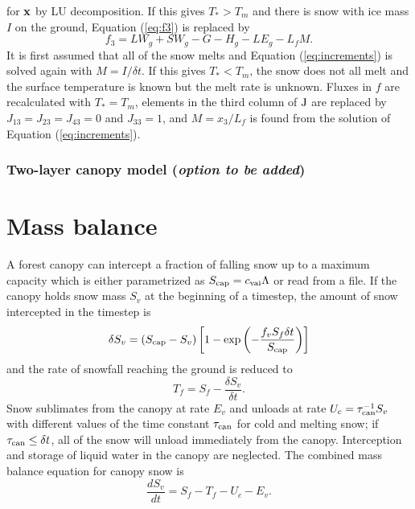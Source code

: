 \documentclass{article}
\begin{document}
for ${\bf x}$ by LU decomposition. If this gives $T_* > T_m$ and there is snow with ice mass $I$ on the ground, Equation (\ref{eq:f3}) is replaced by
\begin{equation}
f_3 = LW_g + SW_g - G - H_g - LE_g - L_fM.
\end{equation}
It is first assumed that all of the snow melts and Equation (\ref{eq:increments}) is solved again with $M = I/\delta t$. If this gives $T_* < T_m$, the snow does not all melt and the surface temperature is known but the melt rate is unknown. Fluxes in $f$ are recalculated with $T_* = T_m$, elements in the third column of ${\rm J}$ are replaced by $J_{13}=J_{23}=J_{43}=0$ and $J_{33}=1$, and $M=x_3/L_f$ is found from the solution of Equation (\ref{eq:increments}).

\subsubsection{Two-layer canopy model ({\it option to be added})}

\section{Mass balance}

A forest canopy can intercept a fraction of falling snow up to a maximum capacity which is either parametrized as $S_{\rm cap} = c_{\rm vai}\Lambda$ or read from a file. If the canopy holds snow mass $S_v$ at the beginning of a timestep, the amount of snow intercepted in the timestep is
\begin{equation}
\delta S_v = (S_{\rm cap} - S_v)\left[1 - \exp\left(-\frac{f_vS_f\delta t}{S_{\rm cap}}
                                \right)\right]
\end{equation}
and the rate of snowfall reaching the ground is reduced to
\begin{equation}
T_f = S_f - \frac{\delta S_v}{\delta t}.
\end{equation}
Snow sublimates from the canopy at rate $E_v$ and unloads at rate $U_c = \tau_{\rm can}^{-1}S_v$ with different values of the time constant $\tau_{\rm can}$ for cold and melting snow; if $\tau_{\rm can} \leq \delta t$, all of the snow will unload immediately from the canopy. Interception and storage of liquid water in the canopy are neglected. The combined mass balance equation for canopy snow is
\begin{equation}
\frac{dS_v}{dt} = S_f - T_f - U_c - E_v.
\end{equation}
\end{document}
